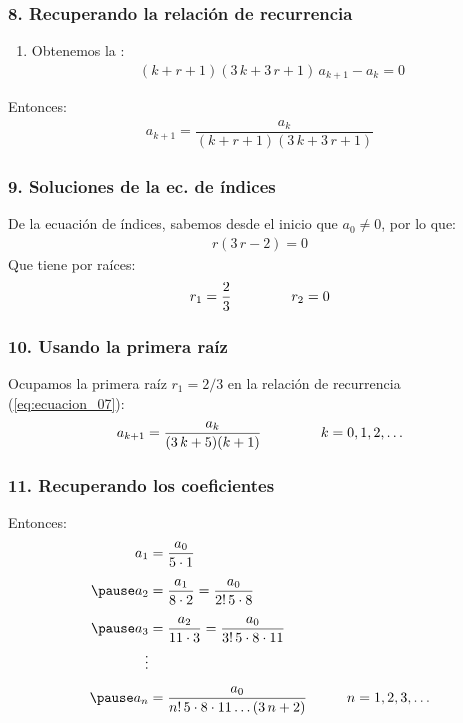 \documentclass[12pt]{beamer}
\begin{document}
\begin{frame}
\frametitle{8. Recuperando la relación de recurrencia}
\begin{enumerate}
\conti
\item Obtenemos la :
\begin{align*}
(k + r + 1)(3 \, k + 3 \, r + 1) \, a_{k+1} - a_{k} = 0
\end{align*}
\end{enumerate}
\pause
Entonces:
\begin{align}
a_{k+1} = \dfrac{a_{k}}{(k + r + 1)(3 \, k + 3 \, r + 1)}
\label{eq:ecuacion_07}
\end{align}
\end{frame}
\begin{frame}
\frametitle{9. Soluciones de la ec. de índices}
De la ecuación de índices, sabemos desde el inicio que $a_{0} \neq 0$, por lo que:
\begin{align}
r (3 \, r - 2) = 0
\label{eq:ecuacion_06}
\end{align}
\pause
Que tiene por raíces:
\begin{align*}
r_{1} = \dfrac{2}{3} \hspace{1.5cm} r_{2} = 0
\end{align*}
\end{frame}
\begin{frame}
\frametitle{10. Usando la primera raíz}
Ocupamos la primera raíz $r_{1} = 2/3$ en la relación de recurrencia (\ref{eq:ecuacion_07}):
\begin{align}
a_{k+1} = \dfrac{a_{k}}{(3 \, k + 5)(k + 1)} \hspace{1.5cm} k = 0, 1, 2, \ldots
\label{eq:ecuacion_08}    
\end{align}
\end{frame}
\begin{frame}
\frametitle{11. Recuperando los coeficientes}
Entonces:
\pause
\begin{eqnarray*}
\begin{aligned}
a_{1} &= \dfrac{a_{0}}{5 \cdot 1} \\[0.5em] \pause
a_{2} &= \dfrac{a_{1}}{8 \cdot 2} = \dfrac{a_{0}}{2! \, 5 \cdot 8} \\[0.5em] \pause
a_{3} &= \dfrac{a_{2}}{11 \cdot 3} = \dfrac{a_{0}}{3! \, 5 \cdot 8 \cdot 11} \\
\vdots \\[0.5em] \pause
a_{n} &= \dfrac{a_{0}}{n! \, 5 \cdot 8 \cdot 11 \ldots (3\, n + 2)} \hspace{1cm} n = 1, 2, 3, \ldots
\end{aligned}
\end{eqnarray*}
\end{frame}
\end{document}

